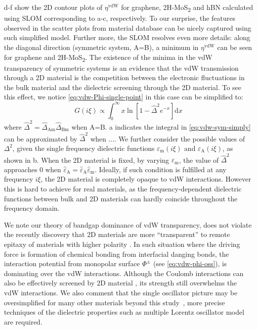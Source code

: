 d-f show the 2D
contour plots of $\eta^{\mathrm{vdW}}$ for graphene,
2H-MoS\textsubscript{2} and hBN calculated using SLOM corresponding
to a-c, respectively.
%
To our surprise, the features observed in the scatter plots from
material database can be nicely captured using such simplified
model.
%
Further more, the SLOM resolves even more details: along the diagonal
direction (\ie symmetric system, A=B), a minimum in
$\eta^{\mathrm{vdW}}$ can be seen for graphene and
2H-MoS\textsubscript{2}.
%
The existence of the minima in the vdW transparency of symmetric
systems is an evidence that the vdW transmission through a 2D material
is the competition between the electronic fluctuations in the bulk
material and the dielectric screening through the 2D material.  To see
this effect, we notice \autoref{eq:vdw-Phi-single-point} in this case can be simplified to:
\begin{equation}
  \label{eq:vdw-sym-simply}
  G(i \xi) \propto \int_{0}^{\infty} x \ln \left[ 1 - \hat{\Delta}^{2} e^{-x}\right] \mathrm{d}x
\end{equation}
where
$\hat{\Delta}^{2} =
\hat{\Delta}_{\mathrm{Am}}\hat{\Delta}_{\mathrm{Bm}}$ when A=B.
%
a indicates the integral in
\autoref{eq:vdw-sym-simply} can be approximated by $\hat{\Delta}^{2}$
when .... We further consider the
possible values of \(\Delta^{2}\), given the single frequency
dielectric functions \(\varepsilon_{\mathrm{m}}(i \xi)\) and
\(\varepsilon_{\mathrm{A}}(i \xi)\), as shown in b.
When the 2D material is fixed, by varying
\(\varepsilon_{\mathrm{m}}\), the value of \(\hat{\Delta}^{2}\)
approaches 0 when
\(\hat{\varepsilon}_{\mathrm{A}} = \hat{\varepsilon}_{\mathrm{A}}
\hat{\varepsilon}_{\mathrm{m}}\). Ideally, if such condition is
fulfilled at any frequency \(i\xi\), the 2D material is completely
opaque to vdW interactions. However this is hard to achieve for real
materials, as the frequency-dependent dielectric functions between
bulk and 2D materials can hardly coincide throughout the frequency
domain. 


We note our theory of bandgap dominance of vdW transparency, does not
violate the recently discovery that 2D materials are more
``transparent'' to remote epitaxy of materials with higher polarity
\cite{Kong_2018_pol}. In such situation where the driving force is
formation of chemical bonding from interfacial danging bonds, the
interaction potential from monopolar surface \(\Phi^{\pm}\) (see \autoref{eq:vdw-phi-oss}), is dominating over the vdW
interactions. Although the Coulomb interactions can also be
effectively screened by 2D material
\cite{Li_2014_screen,Ambrosetti_2019_jpcl}, its strength still
overwhelms the vdW interactions. We also comment that the single
oscillator picture may be oversimplified for many other materials
beyond this study~, more precise techniques of the
dielectric properties such as multiple Lorentz oscillator model are
required.

